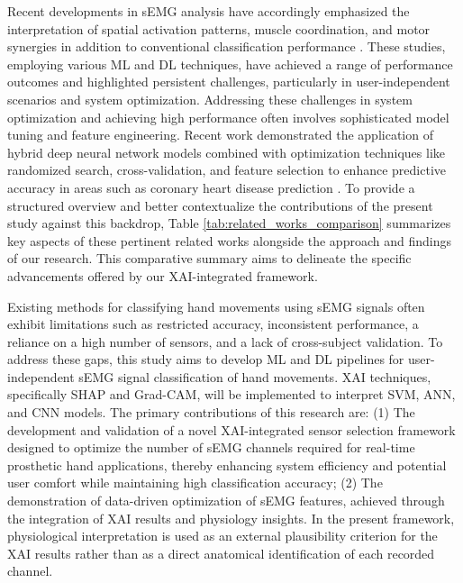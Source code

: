 \documentclass[preprint,12pt]{elsarticle}
\begin{document}
Recent developments in sEMG analysis have accordingly emphasized the interpretation of spatial activation patterns, muscle coordination, and motor synergies in addition to conventional classification performance \cite{s21217322}. These studies, employing various ML and DL techniques, have achieved a range of performance outcomes and highlighted persistent challenges, particularly in user-independent scenarios and system optimization. Addressing these challenges in system optimization and achieving high performance often involves sophisticated model tuning and feature engineering. Recent work demonstrated the application of hybrid deep neural network models combined with optimization techniques like randomized search, cross-validation, and feature selection to enhance predictive accuracy in areas such as coronary heart disease prediction \cite{sharma2023hybrid}. To provide a structured overview and better contextualize the contributions of the present study against this backdrop, Table \ref{tab:related_works_comparison} summarizes key aspects of these pertinent related works alongside the approach and findings of our research. This comparative summary aims to delineate the specific advancements offered by our XAI-integrated framework.

Existing methods for classifying hand movements using sEMG signals often exhibit limitations such as restricted accuracy, inconsistent performance, a reliance on a high number of sensors, and a lack of cross-subject validation. To address these gaps, this study aims to develop ML and DL pipelines for user-independent sEMG signal classification of hand movements. XAI techniques, specifically SHAP and Grad-CAM, will be implemented to interpret SVM, ANN, and CNN models. The primary contributions of this research are: (1) The development and validation of a novel XAI-integrated sensor selection framework designed to optimize the number of sEMG channels required for real-time prosthetic hand applications, thereby enhancing system efficiency and potential user comfort while maintaining high classification accuracy; (2) The demonstration of data-driven optimization of sEMG features, achieved through the integration of XAI results and physiology insights. In the present framework, physiological interpretation is used as an external plausibility criterion for the XAI results rather than as a direct anatomical identification of each recorded channel.
\end{document}
